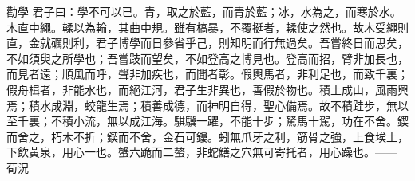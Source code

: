 
\begin{denotation}[3cm]




















\item[勸學]{
    君子曰：學不可以已。青，取之於藍，而青於藍；冰，水為之，而寒於水。木直中繩。輮以為輪，其曲中規。雖有槁暴，不覆挺者，輮使之然也。故木受繩則直，金就礪則利，君子博學而日參省乎己，則知明而行無過矣。吾嘗終日而思矣，不如須臾之所學也；吾嘗跂而望矣，不如登高之博見也。登高而招，臂非加長也，而見者遠；順風而呼，聲非加疾也，而聞者彰。假輿馬者，非利足也，而致千裏；假舟楫者，非能水也，而絕江河，君子生非異也，善假於物也。積土成山，風雨興焉；積水成淵，蛟龍生焉；積善成德，而神明自得，聖心備焉。故不積跬步，無以至千裏；不積小流，無以成江海。騏驥一躍，不能十步；駑馬十駕，功在不舍。鍥而舍之，朽木不折；鍥而不舍，金石可鏤。蚓無爪牙之利，筋骨之強，上食埃土，下飲黃泉，用心一也。蟹六跪而二螯，非蛇鱔之穴無可寄托者，用心躁也。—— 荀況
}

\end{denotation}
